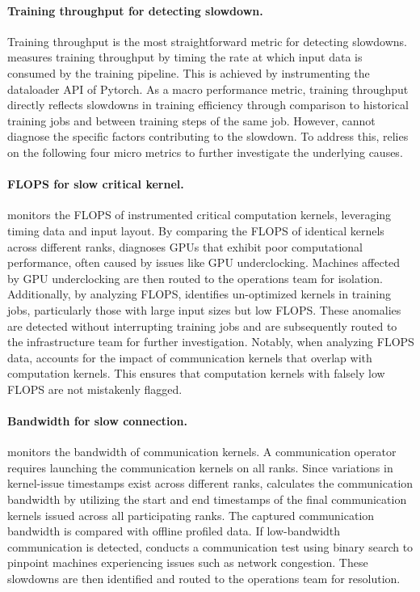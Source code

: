 \paragraph{\protect{} Training throughput for detecting slowdown.}
Training throughput is the most straightforward metric for detecting slowdowns.
\sysname{} measures training throughput by timing the rate at which input data is consumed by the training pipeline.
This is achieved by instrumenting the dataloader API of Pytorch.
As a macro performance metric, training throughput directly reflects slowdowns in training efficiency through comparison to historical training jobs and between training steps of the same job.
However, \sysname{} cannot diagnose the specific factors contributing to the slowdown.
To address this, \sysname{} relies on the following four micro metrics to further investigate the underlying causes.

\paragraph{\protect{} FLOPS for slow critical kernel.}
\sysname{} monitors the FLOPS of instrumented critical computation kernels, leveraging timing data and input layout.
By comparing the FLOPS of identical kernels across different ranks, \sysname{} diagnoses GPUs that exhibit poor computational performance, often caused by issues like GPU underclocking.
Machines affected by GPU underclocking are then routed to the operations team for isolation.
Additionally, by analyzing FLOPS, \sysname{} identifies un-optimized kernels in training jobs, particularly those with large input sizes but low FLOPS.
These anomalies are detected without interrupting training jobs and are subsequently routed to the infrastructure team for further investigation.
Notably, when analyzing FLOPS data, \sysname{} accounts for the impact of communication kernels that overlap with computation kernels.%
This ensures that computation kernels with falsely low FLOPS are not mistakenly flagged. 

\paragraph{\protect{} Bandwidth for slow connection.}
\sysname{} monitors the bandwidth of communication kernels. A communication operator requires launching the communication kernels on all ranks. Since variations in kernel-issue timestamps exist across different ranks, \sysname{} calculates the communication bandwidth by utilizing the start and end timestamps of the final communication kernels issued across all participating ranks.
The captured communication bandwidth is compared with offline profiled data.
If low-bandwidth communication is detected, \sysname{} conducts a communication test using binary search to pinpoint machines experiencing issues such as network congestion.
These slowdowns are then identified and routed to the operations team for resolution.


